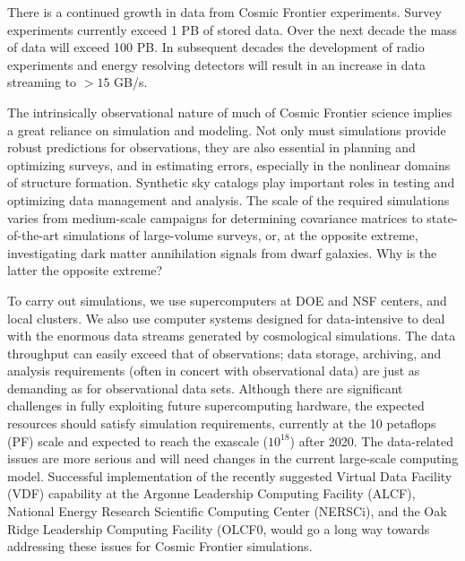 There is a continued growth in data from Cosmic Frontier
experiments. 
Survey experiments currently exceed 1 PB of stored
data. Over the next decade the mass of data will exceed 100 PB. In
subsequent decades the development of radio experiments and energy
resolving detectors will result in an increase in data streaming to
$> 15$ GB/s.

The intrinsically observational nature of much of Cosmic Frontier
science implies a great reliance on simulation and modeling. Not only
must simulations provide robust predictions for observations, they are
also essential in planning and optimizing surveys, and in estimating
errors, especially in the nonlinear domains of structure
formation. Synthetic sky catalogs play important roles in testing and
optimizing data management and analysis. The scale of the
required simulations varies from medium-scale campaigns for
determining covariance matrices to state-of-the-art simulations of
large-volume surveys, or, at the opposite extreme,
investigating dark matter annihilation signals from dwarf galaxies.
{\color{red} Why is the latter the opposite extreme?}

To carry out simulations, we use supercomputers at DOE and NSF centers,
and local clusters.  We also use computer systems designed for
data-intensive to deal with
the enormous data streams generated by cosmological simulations. 
The
data throughput can easily exceed that of observations; data storage,
archiving, and analysis requirements (often in concert with
observational data) are just as demanding as for observational
data sets. Although there are significant challenges in fully
exploiting future supercomputing hardware, the expected resources
should satisfy simulation requirements, currently at the 10 
petaflops (PF)
scale and expected to reach the exascale ($10^18$) after 2020. The data-related
issues are more serious and will need changes in the current
large-scale computing model. Successful implementation of the recently
suggested Virtual Data Facility (VDF) capability at 
the Argonne Leadership Computing Facility (ALCF), 
National Energy Research Scientific Computing Center (NERSCi), and
the Oak Ridge Leadership Computing Facility (OLCF0, 
would go a long way towards addressing these issues for Cosmic Frontier 
simulations.

